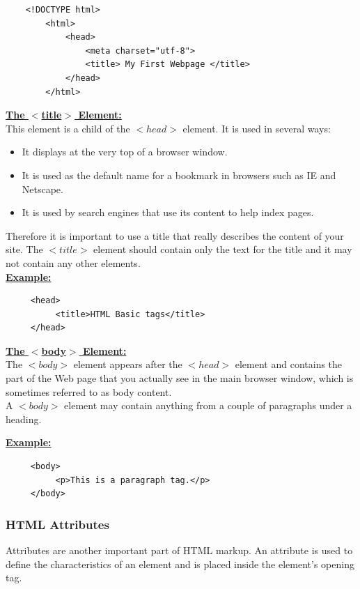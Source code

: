 \documentclass[11pt,a4paper]{article}
\begin{document}
\begin{lstlisting}
    <!DOCTYPE html>
        <html>
            <head>
                <meta charset="utf-8">
                <title> My First Webpage </title>
            </head>
        </html>
\end{lstlisting}

\underline{\textbf{The $<$title$>$ Element:}}\\

This element is a child of the $<head>$ element. It is used in several ways:
\begin{itemize}
\item It displays at the very top of a browser window.
\item It is used as the default name for a bookmark in browsers such as IE and Netscape.
\item It is used by search engines that use its content to help index pages.
\end{itemize}
Therefore it is important to use a title that really describes the content of your site. The $<title>$ element should contain only the text for the title and it may not contain any other elements.\\

\underline{\textbf{Example:}}
\begin{verbatim}
     <head>
          <title>HTML Basic tags</title>
     </head>
\end{verbatim}

\underline{\textbf{The $<$body$>$ Element:}}\\

The $<body>$ element appears after the $<head>$ element and contains the part of the Web page that you actually see in the main browser window, which is sometimes referred to as body content.\\

A $<body>$ element may contain anything from a couple of paragraphs under a heading.

\underline{\textbf{Example:}}
\begin{verbatim}
     <body>
          <p>This is a paragraph tag.</p>
     </body>
\end{verbatim}

\subsubsection*{HTML Attributes}

Attributes are another important part of HTML markup. An attribute is used to define the characteristics of an element and is placed inside the element's opening tag. \\
\end{document}
